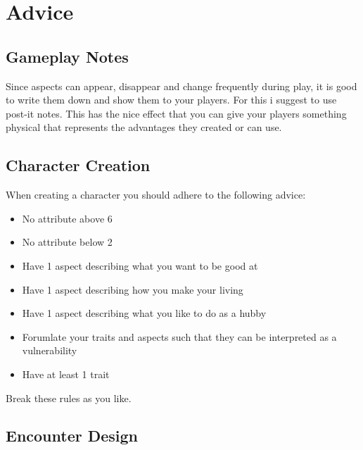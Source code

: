 \documentclass[11pt]{article}
\begin{document}
{\newpage

\section{Advice}
\label{sec:orga455efb}
\subsection{Gameplay Notes}
\label{sec:orgc8bb128}

Since aspects can appear, disappear and change frequently during play, it is good to write them down and show them to your players. For this i suggest to use post-it notes. This has the nice effect that you can give your players something physical that represents the advantages they created or can use.

\subsection{Character Creation}
\label{sec:orga42c53b}

When creating a character you should adhere to the following advice:
\begin{itemize}
\item No attribute above 6
\item No attribute below 2
\item Have 1 aspect describing what you want to be good at
\item Have 1 aspect describing how you make your living
\item Have 1 aspect describing what you like to do as a hubby
\item Forumlate your traits and aspects such that they can be interpreted as a vulnerability
\item Have at least 1 trait
\end{itemize}
Break these rules as you like.

\subsection{Encounter Design}
\label{sec:org10b6ab1}

}
\end{document}
